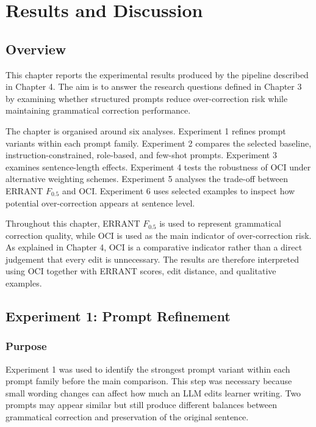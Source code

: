 \chapter{Results and Discussion}

\section{Overview}

This chapter reports the experimental results produced by the pipeline described in Chapter 4. The aim is to answer the research questions defined in Chapter 3 by examining whether structured prompts reduce over-correction risk while maintaining grammatical correction performance.

The chapter is organised around six analyses. Experiment 1 refines prompt variants within each prompt family. Experiment 2 compares the selected baseline, instruction-constrained, role-based, and few-shot prompts. Experiment 3 examines sentence-length effects. Experiment 4 tests the robustness of OCI under alternative weighting schemes. Experiment 5 analyses the trade-off between ERRANT $F_{0.5}$ and OCI. Experiment 6 uses selected examples to inspect how potential over-correction appears at sentence level.

Throughout this chapter, ERRANT $F_{0.5}$ is used to represent grammatical correction quality, while OCI is used as the main indicator of over-correction risk. As explained in Chapter 4, OCI is a comparative indicator rather than a direct judgement that every edit is unnecessary. The results are therefore interpreted using OCI together with ERRANT scores, edit distance, and qualitative examples.

\section{Experiment 1: Prompt Refinement}

\subsection{Purpose}

Experiment 1 was used to identify the strongest prompt variant within each prompt family before the main comparison. This step was necessary because small wording changes can affect how much an LLM edits learner writing. Two prompts may appear similar but still produce different balances between grammatical correction and preservation of the original sentence.

